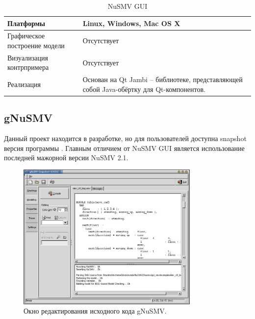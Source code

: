 \begin{table}[ht]
	\caption{NuSMV GUI}\label{tab:nusmv_gui}
	\centering
	\begin{tabular}{|m{2.5 cm}|m{7.5 cm}|}
		\hline
		Платформы & Linux, Windows, Mac OS X \\
		\hline
		Графическое построение модели &Отсутствует \\
		\hline
		Визуализация контрпримера & Отсутствует \\
		\hline
		Реализация & Основан на Qt Jambi – библиотеке, представляющей собой Java-обёртку для Qt-компонентов.\\
		\hline
	\end{tabular}
\end{table}

\subsection{gNuSMV}

Данный проект находится в разработке, но для пользователей доступна snapshot версия программы \cite{nusmv}. Главным отличием от NuSMV GUI является использование последней мажорной версии NuSMV 2.1. 

\begin{figure}[htbp]
	\centering
	\includegraphics[width=0.8\textwidth]{fig/gnusmv1.jpg}
	\caption{Окно редактирования исходного кода gNuSMV.}
	\label{fig:gnusmv1}
\end{figure}

